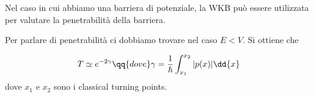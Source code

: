 Nel caso in cui abbiamo una barriera di potenziale, la WKB può essere utilizzata per valutare la penetrabilità della barriera.

Per parlare di penetrabilità ci dobbiamo trovare nel caso $E<V$. Si ottiene che

\begin{equation*}
   T \simeq e^{-2\gamma}
   \qq{dove}
   \gamma=\frac{1}{\hbar} \int_{x_1}^{x_2} |p(x)| \dd{x}
\end{equation*}
dove $x_1$ e $x_2$ sono i classical turning points.

